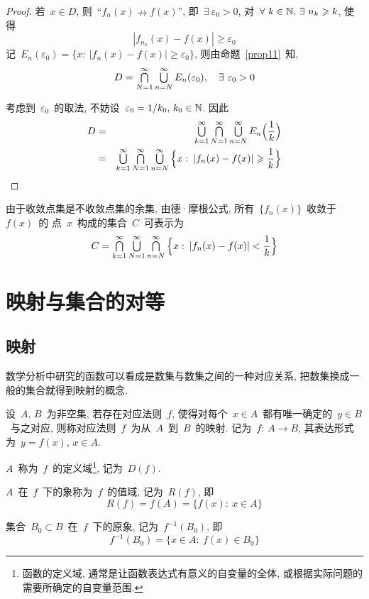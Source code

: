 \begin{proof}
若~$x \in D$, 则~``$f_n(x) \nrightarrow f(x)$'', 即~$\exists~\varepsilon_0 > 0$, 对~$\forall~k \in \mathbb{N}, \, \exists~ n_k \geqslant k$, 使得
\[
|f_{n_k}(x)-f(x)| \geqslant \varepsilon_0
\]
记~$E_n(\varepsilon_0) = \big\{x: \: |f_n(x)-f(x)| \geqslant \varepsilon_0 \big\}$, 则由命题~\ref{prop11}~知,
\[
D = \mathop{\textstyle{\bigcap}}^\infty _{N=1} \mathop{\textstyle{\bigcup}}^\infty _{n=N} E_n(\varepsilon_0), \quad \exists~\varepsilon_0 > 0
\]

考虑到~$\varepsilon_0$~的取法, 不妨设~$\varepsilon_0 = 1/k_0, \, k_0 \in \mathbb{N}$. 因此
\begin{eqnarray*}
D &=& \mathop{\textstyle{\bigcup}}^\infty _{k=1} \mathop{\textstyle{\bigcap}}^\infty _{N=1} \mathop{\textstyle{\bigcup}}^\infty _{n=N} E_n \Big(\frac{1}{k}\Big) \\
&=& \mathop{\textstyle{\bigcup}}^\infty _{k=1} \mathop{\textstyle{\bigcap}}^\infty _{N=1} \mathop{\textstyle{\bigcup}}^\infty _{n=N} \Big\{x: \: |f_n(x)-f(x)| \geqslant \frac{1}{k}\Big\}
\end{eqnarray*}
\end{proof}

\begin{remark}
由于收敛点集是不收敛点集的余集, 由德·摩根公式, 所有~$\{f_n(x)\}$~收敛于~$f(x)$~的
点~$x$~构成的集合~$C$~可表示为
\[
C = \mathop{\textstyle{\bigcap}}^\infty _{k=1} \mathop{\textstyle{\bigcup}}^\infty _{N=1} \mathop{\textstyle{\bigcap}}^\infty _{n=N} \Big\{x: \: |f_n(x)-f(x)| < \frac{1}{k}\Big\}
\]
\end{remark}

\section{映射与集合的对等}

\subsection{映射}

数学分析中研究的函数可以看成是数集与数集之间的一种对应关系, 把数集换成一般的集合就得到映射的概念.

\begin{definition}
设~$A,\,B$~为非空集, 若存在对应法则~$f$, 使得对每个~$x \in A$~都有唯一确定的~$y \in B$~与之对应, 则称对应法则~$f$~为从~$A$~到~$B$~的映射.
记为~$f:\: A \rightarrow B$, 其表达形式为~$y = f(x), \, x \in A$.

$A$~称为~$f$~的定义域\footnote{函数的定义域, 通常是让函数表达式有意义的自变量的全体,
或根据实际问题的需要所确定的自变量范围. }, 记为~$D(f)$.

$A$~在~$f$~下的象称为~$f$~的值域, 记为~$R(f)$, 即
\[
R(f) = f(A)=\{f(x): \: x \in A\}
\]

集合~$B_0 \subset B$~在~$f$~下的原象, 记为~$f^{-1}(B_0)$, 即
\[
f^{-1}(B_0)=\{x \in A: \: f(x) \in B_0\}
\]
\end{definition}

